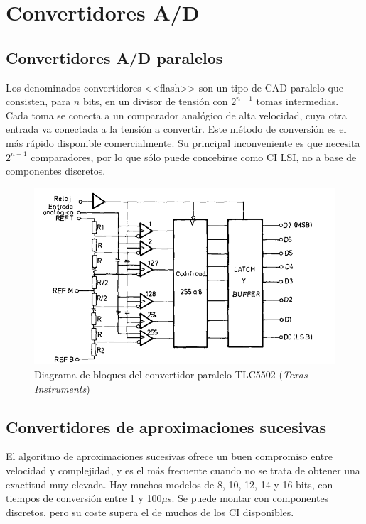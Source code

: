 \chapter{Convertidores A/D}

\section{Convertidores A/D paralelos}

Los denominados convertidores <<flash>> son un tipo de CAD paralelo que consisten, para $n$ bits, en un divisor de tensión con $2^{n-1}$ tomas intermedias. Cada toma se conecta a un comparador analógico de alta velocidad, cuya otra entrada va conectada a la tensión a convertir. Este método de conversión es el más rápido disponible comercialmente. Su principal inconveniente es que necesita $2^{n-1}$ comparadores, por lo que sólo puede concebirse como CI LSI, no a base de componentes discretos.

\begin{figure}[H]
    \centering
    \includegraphics[width=0.75\linewidth]{Imagenes/Convertidor AD paralelo.png}
    \caption{Diagrama de bloques del convertidor paralelo TLC5502 (\textit{Texas Instruments})}
\end{figure}

\section{Convertidores de aproximaciones sucesivas}

El algoritmo de aproximaciones sucesivas ofrece un buen compromiso entre velocidad y complejidad, y es el más frecuente cuando no se trata de obtener una exactitud muy elevada. Hay muchos modelos de 8, 10, 12, 14 y 16 bits, con tiempos de conversión entre 1 y 100$\mu$s. Se puede montar con componentes discretos, pero su coste supera el de muchos de los CI disponibles.

